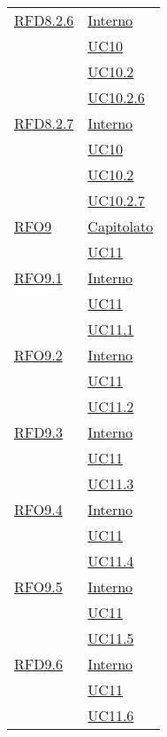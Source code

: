 \begin{longtable}{|>{\centering}m{5cm}|m{5cm}<{\centering}|}
 \hyperlink{RFD8.2.6}{RFD8.2.6} 
 & \hyperlink{Interno}{Interno}\\
 & \hyperref[UC10]{UC10}\\
 & \hyperref[UC10.2]{UC10.2}\\
 & \hyperref[UC10.2.6]{UC10.2.6}\\\hline
 
 \hyperlink{RFD8.2.7}{RFD8.2.7} 
 & \hyperlink{Interno}{Interno}\\
 & \hyperref[UC10]{UC10}\\
 & \hyperref[UC10.2]{UC10.2}\\
 & \hyperref[UC10.2.7]{UC10.2.7}\\\hline
 
  \hyperlink{RFO9}{RFO9} 
  & \hyperlink{Capitolato}{Capitolato}\\
 & \hyperref[UC11]{UC11}\\\hline
 
   \hyperlink{RFO9.1}{RFO9.1} 
   & \hyperlink{Interno}{Interno}\\
 & \hyperref[UC11]{UC11}\\
  & \hyperref[UC11.1]{UC11.1}\\\hline
  
    \hyperlink{RFO9.2}{RFO9.2} 
    & \hyperlink{Interno}{Interno}\\
  & \hyperref[UC11]{UC11}\\
  & \hyperref[UC11.2]{UC11.2}\\\hline
  
     \hyperlink{RFD9.3}{RFD9.3} 
     & \hyperlink{Interno}{Interno}\\
  & \hyperref[UC11]{UC11}\\
  & \hyperref[UC11.3]{UC11.3}\\\hline
  
      \hyperlink{RFO9.4}{RFO9.4} 
      & \hyperlink{Interno}{Interno}\\
  & \hyperref[UC11]{UC11}\\
  & \hyperref[UC11.4]{UC11.4}\\\hline
  
      \hyperlink{RFO9.5}{RFO9.5} 
      & \hyperlink{Interno}{Interno}\\
  & \hyperref[UC11]{UC11}\\
  & \hyperref[UC11.5]{UC11.5}\\\hline
  
      \hyperlink{RFD9.6}{RFD9.6} 
      & \hyperlink{Interno}{Interno}\\
  & \hyperref[UC11]{UC11}\\
  & \hyperref[UC11.6]{UC11.6}\\\hline
  

\end{longtable}
